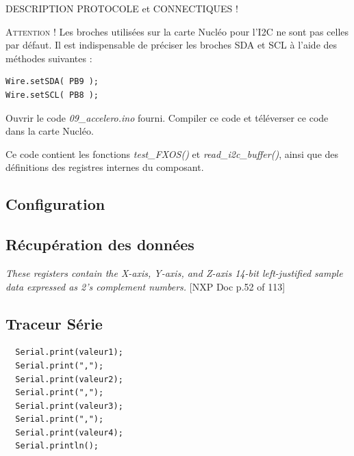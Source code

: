 \documentclass[a4paper,11pt,titlepage]{article} %
\begin{document}
DESCRIPTION PROTOCOLE et CONNECTIQUES !

\bigskip

\textsc{Attention !} Les broches utilisées sur la carte Nucléo pour l'I2C ne sont pas celles par défaut. Il est indispensable de préciser les broches SDA et SCL à l'aide des méthodes suivantes :

\begin{lstlisting}
Wire.setSDA( PB9 );    
Wire.setSCL( PB8 ); 
\end{lstlisting}

\bigskip

\Manip Ouvrir le code \textsl{09\_accelero.ino} fourni. Compiler ce code et téléverser ce code dans la carte Nucléo.

Ce code contient les fonctions \textsl{test\_FXOS()} et \textsl{read\_i2c\_buffer()}, ainsi que des définitions des registres internes du composant.

\Manip 

\subsection{Configuration}


\subsection{Récupération des données}

\textit{These registers contain the X-axis, Y-axis, and Z-axis 14-bit left-justified sample data expressed as 2's complement numbers.} [NXP Doc p.52 of 113] 

\subsection{Traceur Série}

\begin{lstlisting}
  Serial.print(valeur1);
  Serial.print(",");
  Serial.print(valeur2);
  Serial.print(",");
  Serial.print(valeur3);
  Serial.print(",");
  Serial.print(valeur4);
  Serial.println();
\end{lstlisting}
\end{document}

